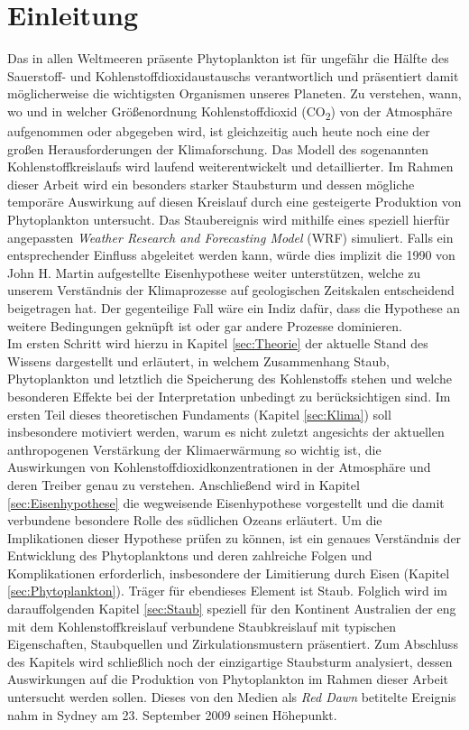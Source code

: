 \documentclass[12pt,a4paper,onecolumn]{scrartcl}
\newcommand{\cotwo}{CO\textsubscript{2}}
\begin{document}
\section{Einleitung} \label{sec:einleitung}
Das in allen Weltmeeren präsente Phytoplankton ist für ungefähr die Hälfte des Sauerstoff- und Kohlenstoffdioxidaustauschs verantwortlich \citep{Emerson.2009} und präsentiert damit möglicherweise die wichtigsten Organismen unseres Planeten. Zu verstehen, wann, wo und in welcher Größenordnung Kohlenstoffdioxid (\cotwo) von der Atmosphäre aufgenommen oder abgegeben wird, ist gleichzeitig auch heute noch eine der großen Herausforderungen der Klimaforschung. Das Modell des sogenannten Kohlenstoffkreislaufs wird laufend weiterentwickelt und detaillierter. Im Rahmen dieser Arbeit wird ein besonders starker Staubsturm und dessen mögliche temporäre Auswirkung auf diesen Kreislauf durch eine gesteigerte Produktion von Phytoplankton untersucht. Das Staubereignis wird mithilfe eines speziell hierfür angepassten \textit{Weather Research and Forecasting Model} (WRF) simuliert. Falls ein entsprechender Einfluss abgeleitet werden kann, würde dies implizit die 1990 von John H. Martin aufgestellte Eisenhypothese weiter unterstützen, welche zu unserem Verständnis der Klimaprozesse auf geologischen Zeitskalen entscheidend beigetragen hat. Der gegenteilige Fall wäre ein Indiz dafür, dass die Hypothese an weitere Bedingungen geknüpft ist oder gar andere Prozesse dominieren.  \\

Im ersten Schritt wird hierzu in Kapitel \ref{sec:Theorie} der aktuelle Stand des Wissens dargestellt und erläutert, in welchem Zusammenhang Staub, Phytoplankton und letztlich die Speicherung des Kohlenstoffs stehen und welche besonderen Effekte bei der Interpretation unbedingt zu berücksichtigen sind.  Im ersten Teil dieses theoretischen Fundaments (Kapitel  \ref{sec:Klima}) soll insbesondere motiviert werden, warum es nicht zuletzt angesichts der aktuellen anthropogenen Verstärkung der Klimaerwärmung so wichtig ist, die Auswirkungen von Kohlenstoffdioxidkonzentrationen in der Atmosphäre und deren Treiber genau zu verstehen. Anschließend wird in Kapitel \ref{sec:Eisenhypothese} die wegweisende Eisenhypothese \citep{Martin.1990} vorgestellt und die damit verbundene besondere Rolle des südlichen Ozeans erläutert. Um die Implikationen dieser Hypothese prüfen zu können, ist ein genaues Verständnis der Entwicklung des Phytoplanktons und deren zahlreiche Folgen und Komplikationen erforderlich, insbesondere der Limitierung durch Eisen  (Kapitel \ref{sec:Phytoplankton}). Träger für ebendieses Element ist Staub. Folglich wird im darauffolgenden Kapitel \ref{sec:Staub} speziell für den Kontinent Australien der eng mit dem Kohlenstoffkreislauf verbundene Staubkreislauf mit typischen Eigenschaften, Staubquellen und Zirkulationsmustern  präsentiert. Zum Abschluss des Kapitels wird schließlich noch der einzigartige Staubsturm analysiert, dessen Auswirkungen auf die Produktion von Phytoplankton im Rahmen dieser Arbeit untersucht werden sollen. Dieses von den Medien als \textit{Red Dawn} betitelte Ereignis nahm in Sydney am 23. September 2009 seinen Höhepunkt. \\
\end{document}
